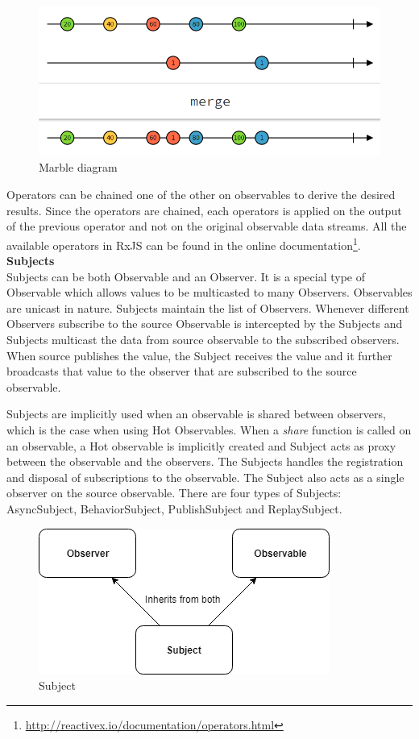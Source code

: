 \begin{figure}[!h]
	\centering
	\includegraphics[scale=0.5,trim=0 0 0 0]{images/operator_marble_diagram.png}
	\caption{Marble diagram}
	\label{fig:operator_marble_diagram}
\end{figure}

Operators can be chained one of the other on observables to derive the desired results. Since the operators are chained, each operators is applied on the output of the previous operator and not on the original observable data streams. All the available operators in RxJS can be found in the online documentation\footnote{\url{http://reactivex.io/documentation/operators.html}}.
\\
\textbf{Subjects}
\\
Subjects can be both Observable and an Observer\cite{reactiveSubjects}. It is a special type of Observable which allows values to be multicasted to many Observers. Observables are unicast in nature. Subjects maintain the list of Observers. Whenever different Observers subscribe to the source Observable is intercepted by the Subjects and Subjects multicast the data from source observable to the subscribed observers. When source publishes the value, the Subject receives the value and it further broadcasts that value to the observer that are subscribed to the source observable. 


Subjects are implicitly used when an observable is shared between observers, which is the case when using Hot Observables. When a \textit{share} function is called on an observable, a Hot observable is implicitly created and Subject acts as proxy between the observable and the observers. The Subjects handles the registration and disposal of subscriptions to the observable. The Subject also acts as a single observer on the source observable. There are four types of Subjects: AsyncSubject, BehaviorSubject, PublishSubject and ReplaySubject.

\begin{figure}[!h]
	\centering
	\includegraphics[scale=0.5,trim=0 0 0 0]{images/subjects.png}
	\caption{Subject}
	\label{fig:subject_diagram}
\end{figure}

